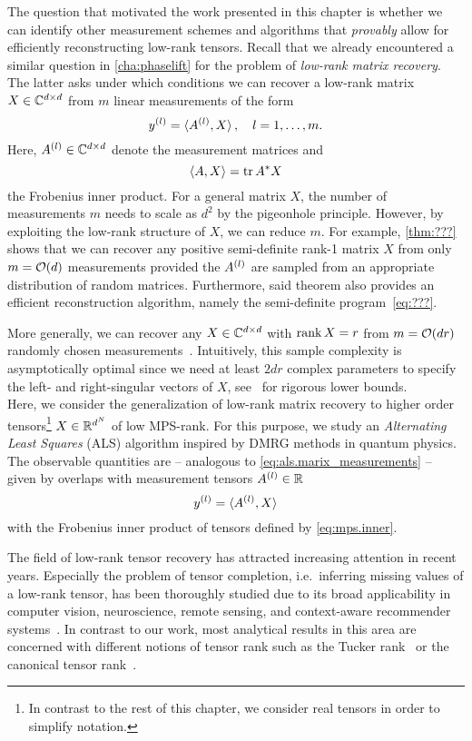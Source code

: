 The question that motivated the work presented in this chapter is whether we can identify other measurement schemes and algorithms that \emph{provably} allow for efficiently reconstructing low-rank tensors.
Recall that we already encountered a similar question in \cref{cha:phaselift} for the problem of \emph{low-rank matrix recovery}.
The latter asks under which conditions we can recover a low-rank matrix $X \in {\mathbb{C}}^{d \times d}$ from $m$ linear measurements of the form
\[
  y^{(l)} = \braket{A^{(l)}, X}, \quad l=1, \ldots, m.
  \label{eq:als.matrix_measurements}
\]
Here, $A^{(l)} \in {\mathbb{C}}^{d \times d}$ denote the measurement matrices and
\[
  \braket{A, X} = \operatorname{tr} {{A}^\ast} X
\]
the Frobenius inner product.
For a general matrix $X$, the number of measurements $m$ needs to scale as $d^2$ by the pigeonhole principle.
However, by exploiting the low-rank structure of $X$, we can reduce $m$.
For example, \cref{thm:???} shows that we can recover any positive semi-definite rank-1 matrix $X$ from only $m = {\mathcal{O}}(d)$ measurements provided the $A^{(l)}$ are sampled from an appropriate distribution of random matrices.
Furthermore, said theorem also provides an efficient reconstruction algorithm, namely the semi-definite program~\eqref{eq:???}.

More generally, we can recover any $X \in {\mathbb{C}}^{d \times d}$ with $\operatorname{rank} X = r$ from $m = {\mathcal{O}}(d r)$ randomly chosen measurements~\cite{Candes_2011_Tight,Kueng_2014_Low}.
Intuitively, this sample complexity is asymptotically optimal since we need at least $2 d r$ complex parameters to specify the left- and right-singular vectors of $X$, see~\cite{Eldar_2012_Uniqueness,Li_2017_Optimal} for rigorous lower bounds.\\




Here, we consider the generalization of low-rank matrix recovery to higher order tensors\footnote{%
  In contrast to the rest of this chapter, we consider real tensors in order to simplify notation.
}
$X \in {\mathbb{R}}^{d^N}$ of low MPS-rank.
For this purpose, we study an \emph{Alternating Least Squares} (ALS) algorithm inspired by DMRG methods in quantum physics.
The observable quantities are -- analogous to \cref{eq:als.marix_measurements} -- given by overlaps with measurement tensors $A^{(l)} \in {\mathbb{R}}$
\[
  y^{(l)} = \braket{A^{(l)}, X}
  \label{eq:als.tensor_measurements}
\]
with the Frobenius inner product of tensors defined by \cref{eq:mps.inner}.

The field of low-rank tensor recovery has attracted increasing attention in recent years.
Especially the problem of tensor completion, i.e.\ inferring missing values of a low-rank tensor, has been thoroughly studied due to its broad applicability in computer vision, neuroscience, remote sensing, and context-aware recommender systems~\cite{Li_2010_Tensor,Zhu_2016_ContextAware,Wang_2014_LowRank}.
In contrast to our work, most analytical results in this area are concerned with different notions of tensor rank such as the Tucker rank~\cite{Kressner_2013_LowRank,Zhang_2016_Cross} or the canonical tensor rank~\cite{Krishnamurthy_2013_LowRank,Potechin_2017_Exact}.

